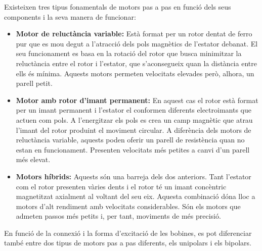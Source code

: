 Existeixen tres tipus fonamentals de motors pas a pas en funció dels seus components i la seva manera de funcionar:

\begin{itemize}
	\item \textbf{Motor de reluctància variable:} Està format per un rotor dentat de ferro pur que es mou degut a l'atracció dels pols magnètics de l'estator debanat. El seu funcionament es basa en la rotació del rotor que busca minimitzar la reluctància entre el rotor i l'estator, que s'aconsegueix quan la distància entre ells és mínima. Aquests motors permeten velocitats elevades però, alhora, un parell petit. 
	
	\item \textbf{Motor amb rotor d'imant permanent:} En aquest cas el rotor està format per un imant permanent i l'estator el conformen diferents electroimants que actuen com pols. A l'energitzar els pols es crea un camp magnètic que atrau l'imant del rotor produint el moviment circular. A diferència dels motors de reluctància variable, aquests poden oferir un parell de resistència quan no estan en funcionament. Presenten velocitats més petites a canvi d'un parell més elevat. 
	
	\item \textbf{Motors híbrids:} Aquests són una barreja dels dos anteriors. Tant l'estator com el rotor presenten vàries dents i el rotor té un imant concèntric magnetitzat axialment al voltant del seu eix. Aquesta combinació dóna lloc a motors d'alt rendiment amb velocitats considerables. Són els motors que admeten passos més petits i, per tant, moviments de més precisió. 
\end{itemize}
En funció de la connexió i la forma d'excitació de les  bobines, es pot diferenciar també entre dos tipus de motors pas a pas diferents, els unipolars i els bipolars.


